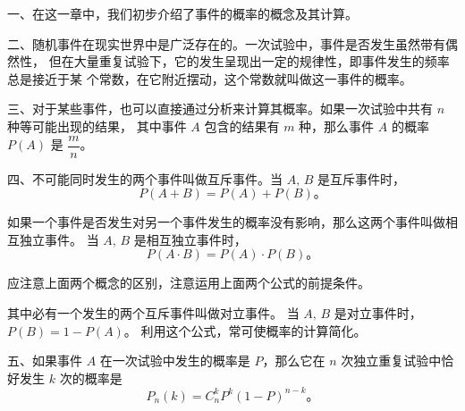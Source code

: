 \xiaojie

一、在这一章中，我们初步介绍了事件的概率的概念及其计算。


二、随机事件在现实世界中是广泛存在的。一次试验中，事件是否发生虽然带有偶然性，
但在大量重复试验下，它的发生呈现出一定的规律性，即事件发生的频率总是接近于某
个常数，在它附近摆动，这个常数就叫做这一事件的概率。


三、对于某些事件，也可以直接通过分析来计算其概率。如果一次试验中共有 $n$ 种等可能出现的结果，
其中事件 $A$ 包含的结果有 $m$ 种，那么事件 $A$ 的概率 $P(A)$ 是 $\dfrac{m}{n}$。


四、不可能同时发生的两个事件叫做互斥事件。当 $A,\, B$ 是互斥事件时，
$$ P(A + B) = P(A) + P(B) \text{。} $$

如果一个事件是否发生对另一个事件发生的概率没有影响，那么这两个事件叫做相互独立事件。
当 $A,\, B$ 是相互独立事件时，
$$ P(A \cdot B) = P(A) \cdot P(B) \text{。} $$

应注意上面两个概念的区别，注意运用上面两个公式的前提条件。

其中必有一个发生的两个互斥事件叫做对立事件。
当 $A,\, B$ 是对立事件时，$P(B) = 1 - P(A)$。
利用这个公式，常可使概率的计算简化。


五、如果事件 $A$ 在一次试验中发生的概率是 $P$，那么它在 $n$ 次独立重复试验中恰好发生 $k$ 次的概率是
$$ P_n(k) = C_n^k P^k (1 - P)^{n-k} \text{。} $$

